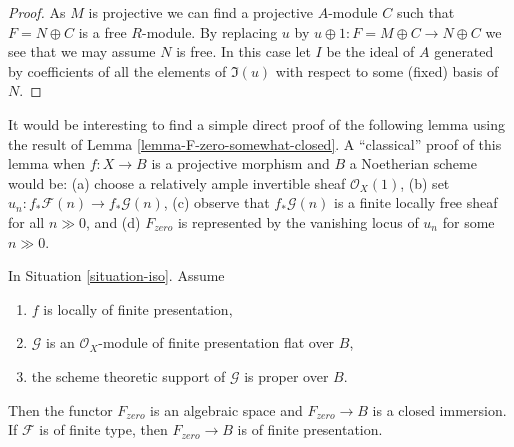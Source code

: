 \begin{proof}
As $M$ is projective we can find a projective $A$-module $C$
such that $F = N \oplus C$ is a free $R$-module.
By replacing $u$ by $u \oplus 1 : F = M \oplus C \to N \oplus C$
we see that we may assume $N$ is free. In this case let $I$ be
the ideal of $A$ generated by coefficients of all the elements of
$\Im(u)$ with respect to some (fixed) basis of $N$.
\end{proof}

\noindent
It would be interesting to find a simple direct proof of the following
lemma using the result of Lemma \ref{lemma-F-zero-somewhat-closed}.
A ``classical'' proof of this lemma when $f : X \to B$ is a projective
morphism and $B$ a Noetherian scheme would be: (a) choose a relatively ample
invertible sheaf $\mathcal{O}_X(1)$, (b) set
$u_n : f_*\mathcal{F}(n) \to f_*\mathcal{G}(n)$,
(c) observe that $f_*\mathcal{G}(n)$ is a finite locally free sheaf
for all $n \gg 0$, and (d) $F_{zero}$ is represented by the vanishing
locus of $u_n$ for some $n \gg 0$.

\begin{lemma}
\label{lemma-F-zero-closed}
In Situation \ref{situation-iso}. Assume
\begin{enumerate}
\item $f$ is locally of finite presentation,
\item $\mathcal{G}$ is an $\mathcal{O}_X$-module of finite presentation
flat over $B$,
\item the scheme theoretic support of $\mathcal{G}$ is proper over $B$.
\end{enumerate}
Then the functor $F_{zero}$ is an algebraic space and $F_{zero} \to B$
is a closed immersion. If $\mathcal{F}$ is of finite type, then
$F_{zero} \to B$ is of finite presentation.
\end{lemma}

